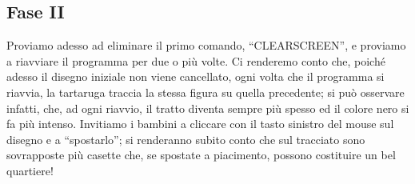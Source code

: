 \subsection{Fase II}

Proviamo adesso ad eliminare il primo comando, “CLEARSCREEN”, e proviamo a riavviare il programma per due o più volte. Ci renderemo conto che, poiché adesso il disegno iniziale non viene cancellato, ogni volta che il programma si riavvia, la tartaruga traccia la stessa figura su quella precedente; si può osservare infatti, che, ad ogni riavvio, il tratto diventa sempre più spesso ed il colore nero si fa più intenso. Invitiamo i bambini a cliccare con il tasto sinistro del mouse sul disegno e a “spostarlo”; si renderanno subito conto che sul tracciato sono sovrapposte più casette che, se spostate a piacimento, possono costituire un bel quartiere!

